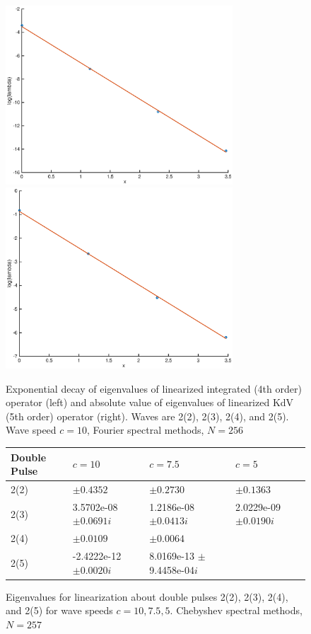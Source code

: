 \documentclass[12pt]{article}
\begin{document}
\begin{figure}[H]
	\includegraphics[width=8.5cm]{decayinteigenvalue}
	\includegraphics[width=8.5cm]{decayeigenvalue}
	\caption{Exponential decay of eigenvalues of linearized integrated (4th order) operator (left) and absolute value of eigenvalues of linearized KdV (5th order) operator (right). Waves are 2(2), 2(3), 2(4), and 2(5). Wave speed $c = 10$, Fourier spectral methods, $N = 256$}
\end{figure}

\begin{figure}[H]
\begin{tabular}{l|lll}
 Double Pulse   & $c = 10$            & $c=7.5$                        & $c=5$        \\ \hline
  2(2) &     $\pm 0.4352$             & $\pm 0.2730$                   & $\pm 0.1363$ \\ 
  2(3) &     3.5702e-08 $\pm 0.0691i$ & 1.2186e-08 $\pm 0.0413i$       & 2.0229e-09 $\pm 0.0190i$\\ 
  2(4) &     $\pm 0.0109$             & $\pm 0.0064$                   & \\ 
  2(5) &    -2.4222e-12 $\pm 0.0020i$ & 8.0169e-13 $\pm$ 9.4458e-04$i$ & \\
\end{tabular}
\caption{Eigenvalues for linearization about double pulses 2(2), 2(3), 2(4), and 2(5) for wave speeds $c = 10, 7.5, 5$. Chebyshev spectral methods, $N = 257$}
\end{figure}
\end{document}
